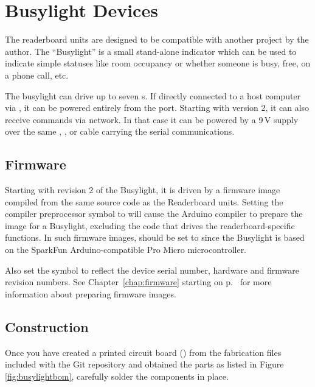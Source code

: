 \section{Busylight Devices}
The readerboard units are designed to be compatible with another project by the author. The ``Busylight''
is a small stand-alone indicator which can be used to indicate simple statuses like room occupancy or
whether someone is busy, free, on a phone call, etc.

The busylight can drive up to seven s. If directly connected to a host computer
via , it can be powered entirely from the  port. Starting with version 2,
it can also receive commands via  network. In that case it can be powered by a 9\,V
supply over the same , , or  cable carrying the serial
communications.

\subsection{Firmware}
Starting with revision 2 of the Busylight, it is driven by a firmware image compiled from the same
source code as the Readerboard units. Setting the compiler preprocessor symbol
 to  will cause the Arduino compiler to prepare the image
for a Busylight, excluding the code that drives the readerboard-specific functions.
In such firmware images,  should be set to  since the Busylight is
based on the SparkFun Arduino-compatible Pro Micro microcontroller.

Also set the  symbol to reflect the device serial number, hardware and firmware
revision numbers. See Chapter~\ref{chap:firmware} starting on p.~\pageref{chap:firmware} for more information
about preparing firmware images.

\subsection{Construction}
Once you have created a printed circuit board () from the fabrication
files included with the Git repository and obtained the parts
as listed in Figure \ref{fig:busylightbom}, carefully solder the components in place.

